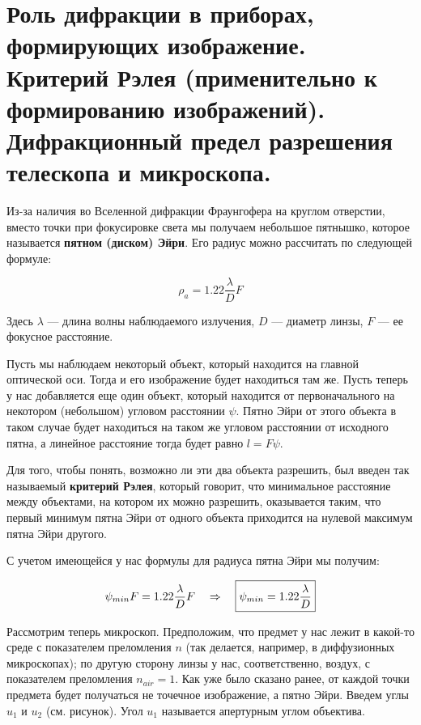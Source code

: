 \section{Роль дифракции в приборах, формирующих изображение. Критерий Рэлея (применительно к формированию изображений). Дифракционный предел разрешения телескопа и микроскопа.}

Из-за наличия во Вселенной дифракции Фраунгофера на круглом отверстии, вместо точки при фокусировке света мы получаем небольшое пятнышко, которое называется \textbf{пятном (диском) Эйри}. Его радиус можно рассчитать по следующей формуле:

\begin{equation*}
	\rho_{a} = 1.22 \frac{\lambda}{D} F	
\end{equation*}

Здесь $\lambda$ --- длина волны наблюдаемого излучения, $D$ --- диаметр линзы, $F$ --- ее фокусное расстояние.

Пусть мы наблюдаем некоторый объект, который находится на главной оптической оси. Тогда и его изображение будет находиться там же. Пусть теперь у нас добавляется еще один объект, который находится от первоначального на некотором (небольшом) угловом расстоянии $\psi$. Пятно Эйри от этого объекта в таком случае будет находиться на таком же угловом расстоянии от исходного пятна, а линейное расстояние тогда будет равно $l = F \psi$. 

Для того, чтобы понять, возможно ли эти два объекта разрешить, был введен так называемый \textbf{критерий Рэлея}, который говорит, что минимальное расстояние между объектами, на котором их можно разрешить, оказывается таким, что первый минимум пятна Эйри от одного объекта приходится на нулевой максимум пятна Эйри другого.

С учетом имеющейся у нас формулы для радиуса пятна Эйри мы получим:

\begin{equation*}
	\psi_{min} F = 1.22 \frac{\lambda}{D} F \quad \Rightarrow \quad \boxed{\psi_{min} = 1.22 \frac{\lambda}{D}}
\end{equation*}

Рассмотрим теперь микроскоп. Предположим, что предмет у нас лежит в какой-то среде с показателем преломления $n$ (так делается, например, в диффузионных микроскопах); по другую сторону линзы у нас, соответственно, воздух, с показателем преломления $n_{air} = 1$. Как уже было сказано ранее, от каждой точки предмета будет получаться не точечное изображение, а пятно Эйри. Введем углы $u_1$ и $u_2$ (см. рисунок). Угол $u_1$ называется апертурным углом объектива.

